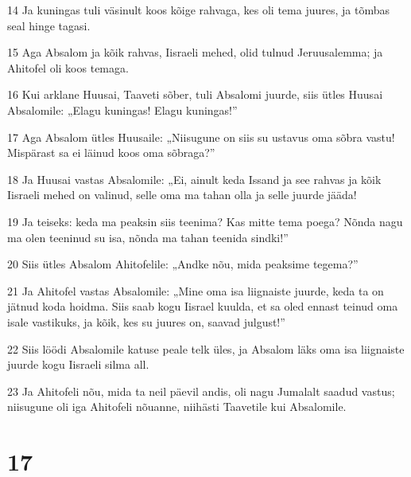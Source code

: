 \par 14 Ja kuningas tuli väsinult koos kõige rahvaga, kes oli tema juures, ja tõmbas seal hinge tagasi.
\par 15 Aga Absalom ja kõik rahvas, Iisraeli mehed, olid tulnud Jeruusalemma; ja Ahitofel oli koos temaga.
\par 16 Kui arklane Huusai, Taaveti sõber, tuli Absalomi juurde, siis ütles Huusai Absalomile: „Elagu kuningas! Elagu kuningas!”
\par 17 Aga Absalom ütles Huusaile: „Niisugune on siis su ustavus oma sõbra vastu! Mispärast sa ei läinud koos oma sõbraga?”
\par 18 Ja Huusai vastas Absalomile: „Ei, ainult keda Issand ja see rahvas ja kõik Iisraeli mehed on valinud, selle oma ma tahan olla ja selle juurde jääda!
\par 19 Ja teiseks: keda ma peaksin siis teenima? Kas mitte tema poega? Nõnda nagu ma olen teeninud su isa, nõnda ma tahan teenida sindki!”
\par 20 Siis ütles Absalom Ahitofelile: „Andke nõu, mida peaksime tegema?”
\par 21 Ja Ahitofel vastas Absalomile: „Mine oma isa liignaiste juurde, keda ta on jätnud koda hoidma. Siis saab kogu Iisrael kuulda, et sa oled ennast teinud oma isale vastikuks, ja kõik, kes su juures on, saavad julgust!”
\par 22 Siis löödi Absalomile katuse peale telk üles, ja Absalom läks oma isa liignaiste juurde kogu Iisraeli silma all.
\par 23 Ja Ahitofeli nõu, mida ta neil päevil andis, oli nagu Jumalalt saadud vastus; niisugune oli iga Ahitofeli nõuanne, niihästi Taavetile kui Absalomile.

\chapter{17}

